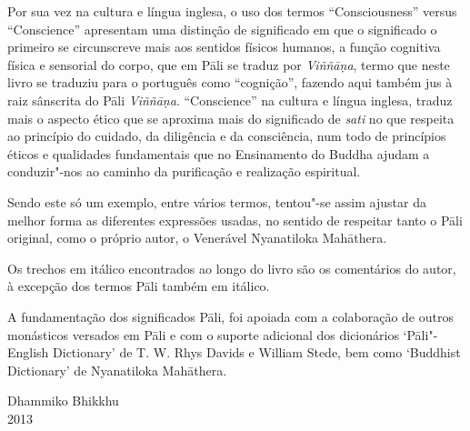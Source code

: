 Por sua vez na cultura e língua inglesa, o uso dos termos ``Consciousness''
versus ``Conscience'' apresentam uma distinção de significado em que o
significado o primeiro se circunscreve mais aos sentidos físicos humanos, a
função cognitiva física e sensorial do corpo, que em Pāli se traduz por
\emph{Viññāṇa}, termo que neste livro se traduziu para o português como
``cognição'', fazendo aqui também jus à raiz sânscrita do Pāli \emph{Viññāṇa}.
``Conscience'' na cultura e língua inglesa, traduz mais o aspecto ético que se
aproxima mais do significado de \emph{sati} no que respeita ao princípio do
cuidado, da diligência e da consciência, num todo de princípios éticos e
qualidades fundamentais que no Ensinamento do Buddha ajudam a conduzir"-nos ao
caminho da purificação e realização espiritual.

Sendo este só um exemplo, entre vários termos, tentou"-se assim ajustar da melhor
forma as diferentes expressões usadas, no sentido de respeitar tanto o Pāli
original, como o próprio autor, o Venerável Nyanatiloka Mahāthera.

Os trechos em itálico encontrados ao longo do livro são os comentários do autor,
à excepção dos termos Pāli também em itálico.

A fundamentação dos significados Pāli, foi apoiada com a colaboração de outros
monásticos versados em Pāli e com o suporte adicional dos dicionários
`Pāli"-English Dictionary' de T. W. Rhys Davids e William Stede, bem como
`Buddhist Dictionary' de Nyanatiloka Mahāthera.

\bigskip

{\raggedleft
  Dhammiko Bhikkhu\\
  2013
\par}
